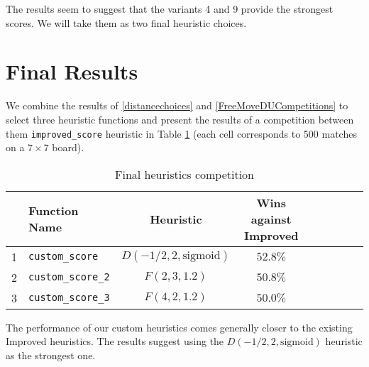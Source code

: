 \documentclass[oneside]{article}   	%
\begin{document}
The results seem to suggest that the variants 4 and 9 provide the strongest scores. We will take them as two final heuristic choices.



\section{Final Results}

We combine the results of \ref{distancechoices} and \ref{FreeMoveDUCompetitions} to select three heuristic functions and present the results of a competition between them \texttt{improved\_score} heuristic in Table \ref{FinalCompetition} (each cell corresponds to 500 matches on a $7\times 7$ board).

\begin{table}[htp]
\caption{Final heuristics competition}
\begin{center}
\begin{tabular}{c|lc|cccccc}
   & Function Name & Heuristic & Wins against Improved \\
   \hline
1 & \texttt{custom\_score}    & $D(-1/2, 2, \textrm{sigmoid})$ & $52.8\%$  \\
2 & \texttt{custom\_score\_2} & $F(2, 3, 1.2)$                 & $50.8\%$  \\
3 & \texttt{custom\_score\_3} & $F(4, 2, 1.2)$                 & $50.0\%$  
\end{tabular}
\end{center}
\label{FinalCompetition}
\end{table}%

The performance of our custom heuristics comes generally closer to the existing Improved heuristics. The results suggest using the $D(-1/2, 2, \textrm{sigmoid})$ heuristic as the strongest one. 
\end{document}
